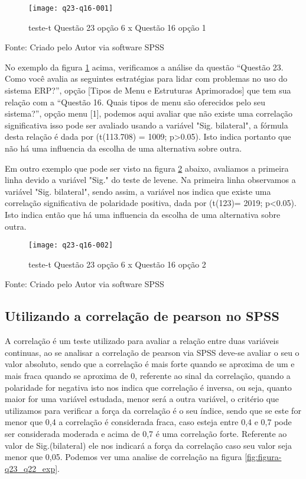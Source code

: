 \begin{figure}[H]
	\centering	
	\caption{teste-t Questão 23 opção 6 x Questão 16 opção 1}
	\texttt{[image: q23-q16-001]}
	\label{fig:figura-q23_q16_001}
\end{figure}
\vspace{-0.8 cm} \hspace{1.45 cm} Fonte: Criado pelo Autor via software SPSS\newline

No exemplo da figura \ref{fig:figura-q23_q16_001} acima, verificamos a análise da questão “Questão 23. Como você avalia as seguintes estratégias para lidar com problemas no uso do sistema ERP?”, opção [Tipos de Menu e Estruturas Aprimorados] que tem sua relação com a “Questão 16. Quais tipos de menu são oferecidos pelo seu sistema?”, opção menu [1], podemos aqui avaliar que não existe uma correlação significativa isso pode ser avaliado usando a variável "Sig. bilateral", a fórmula desta relação é dada por (t(113.708) = 1009; p>0.05). Isto indica portanto que não há uma influencia da escolha de uma alternativa sobre outra.

Em outro exemplo que pode ser visto na figura \ref{fig:figura-q23_q16_002} abaixo, avaliamos a primeira linha devido a variável "Sig." do teste de levene. Na primeira linha observamos a variável "Sig. bilateral", sendo assim, a variável nos indica que existe uma correlação significativa de polaridade positiva, dada por (t(123)= 2019; p<0.05). Isto indica então que há uma influencia da escolha de uma alternativa sobre outra.

\begin{figure}[H]
	\centering	
	\caption{teste-t Questão 23 opção 6 x Questão 16 opção 2}
	\texttt{[image: q23-q16-002]}
	\label{fig:figura-q23_q16_002}
\end{figure}
\vspace{-0.8 cm} \hspace{1.45 cm} Fonte: Criado pelo Autor via software SPSS\newline

\subsection{Utilizando a correlação de pearson no SPSS}

A correlação é um teste utilizado para avaliar a relação entre duas  variáveis continuas, ao se analisar a correlação de pearson via SPSS deve-se avaliar o seu o valor absoluto, sendo que a correlação é mais  forte quando se aproxima de um e mais fraca quando se aproxima de 0, referente ao sinal da correlação, quando a polaridade for negativa isto nos indica que correlação é inversa, ou seja, quanto maior for uma variável estudada, menor será a outra variável, o critério que utilizamos para  verificar a força da  correlação é o seu índice, sendo que se este for menor que 0,4 a correlação é considerada fraca, caso esteja entre 0,4 e 0,7 pode ser considerada moderada e acima de 0,7 é uma correlação forte. Referente ao valor de Sig.(bilateral) ele nos indicará a força da correlação caso seu valor seja menor que 0,05. Podemos ver uma analise de correlação na figura \ref{fig:figura-q23_q22_exp}.

